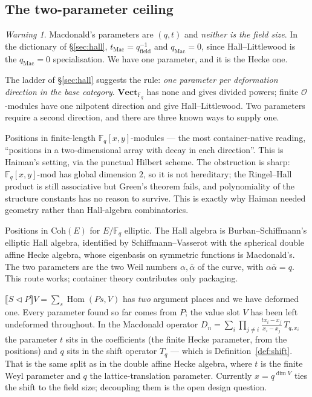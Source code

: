\documentclass[11pt,a4paper]{article}
\theoremstyle{definition}
\theoremstyle{remark}
\newtheorem{warning}[theorem]{Warning}
\newcommand{\FF}{\mathbb{F}}
\newcommand{\cat}[1]{\mathbf{#1}}
\newcommand{\Vect}{\cat{Vect}}
\newcommand{\ext}[1]{\llbracket #1 \rrbracket}
\newcommand{\con}{\triangleleft}
\DeclareMathOperator{\Hom}{Hom}
\begin{document}
\subsection{The two-parameter ceiling}\label{sec:ceiling}

\begin{warning}
Macdonald's parameters are $(q,t)$ and \emph{neither is the field size}. In the
dictionary of \S\ref{sec:hall}, $t_{\mathrm{Mac}} = q_{\mathrm{field}}^{-1}$ and
$q_{\mathrm{Mac}} = 0$, since Hall--Littlewood is the $q_{\mathrm{Mac}} = 0$
specialisation. We have one parameter, and it is the Hecke one.
\end{warning}

The ladder of \S\ref{sec:hall} suggests the rule: \emph{one parameter per
deformation direction in the base category}. $\Vect_{\FF_q}$ has none and gives
divided powers; finite $\mathcal{O}$-modules have one nilpotent direction and give
Hall--Littlewood. Two parameters require a second direction, and there are three
known ways to supply one.

\begin{description}[leftmargin=1.6em,style=nextline,nosep]
\item[Two nilpotent directions.] Positions in finite-length $\FF_q[x,y]$-modules ---
the most container-native reading, ``positions in a two-dimensional array with decay
in each direction''. This is Haiman's setting, via the punctual Hilbert scheme. The
obstruction is sharp: $\FF_q[x,y]$-mod has global dimension $2$, so it is not
hereditary; the Ringel--Hall product is still associative but Green's theorem fails,
and polynomiality of the structure constants has no reason to survive. This is
exactly why Haiman needed geometry rather than Hall-algebra combinatorics.
\item[An elliptic curve.] Positions in $\mathrm{Coh}(E)$ for $E/\FF_q$ elliptic. The
Hall algebra is Burban--Schiffmann's elliptic Hall algebra, identified by
Schiffmann--Vasserot with the spherical double affine Hecke algebra, whose
eigenbasis on symmetric functions is Macdonald's. The two parameters are the two
Weil numbers $\alpha, \bar{\alpha}$ of the curve, with $\alpha\bar\alpha = q$. This
route works; container theory contributes only packaging.
\item[Decoupling the two ends.] $\ext{S \con P}V = \sum_s \Hom(P s, V)$ has
\emph{two} argument places and we have deformed one. Every parameter found so far
comes from $P$; the value slot $V$ has been left undeformed throughout. In the
Macdonald operator
$D_n = \sum_i \prod_{j \neq i} \frac{t x_i - x_j}{x_i - x_j}\,T_{q, x_i}$ the
parameter $t$ sits in the coefficients (the finite Hecke parameter, from the
positions) and $q$ sits in the shift operator $T_q$ --- which is
Definition~\ref{def:shift}. That is the same split as in the double affine Hecke
algebra, where $t$ is the finite Weyl parameter and $q$ the lattice-translation
parameter. Currently $x = q^{\dim V}$ ties the shift to the field size; decoupling
them is the open design question.
\end{description}
\end{document}
